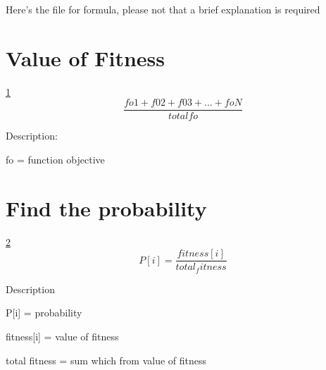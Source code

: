 Here's the file for formula, please not that a brief explanation is required

\section{Value of Fitness} \label{fitness}
    \ref{fitness}
    \begin{equation}
        \frac{fo1 + f02 + f03 + ... + foN}{total fo}
    \end{equation}
    \par Description:
    \par fo = function objective

\section{Find the probability} \label{ptobabilty}
    \ref{ptobabilty}
    \begin{equation}
        P[i] = \frac{fitness[i]}{total_fitness}
    \end{equation}
    \par Description
    \par P[i] = probability
    \par fitness[i] = value of fitness
    \par total fitness = sum which from value of fitness 